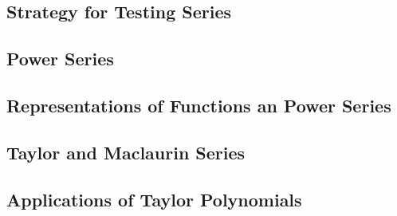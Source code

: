 \documentclass{article}
\begin{document}
    \subsection{Strategy for Testing Series}
    \begin{outline}
        
    \end{outline}
    \subsection{Power Series}
    \begin{outline}
        
    \end{outline}
    \subsection{Representations of Functions an Power Series}
    \begin{outline}
        
    \end{outline}
    \subsection{Taylor and Maclaurin Series}
    \begin{outline}
        
    \end{outline}
    \subsection{Applications of Taylor Polynomials}
    \begin{outline}
        
    \end{outline}
\end{document}
